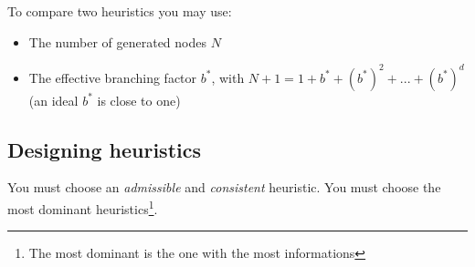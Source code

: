 To compare two heuristics you may use:
\begin{itemize}
\item The number of generated nodes $N$
\item The effective branching factor $b^*$, with $N+1 = 1 + b^* + (b^*)^2 + ... + (b^*)^d$ (an ideal $b^*$ is close to one)
\end{itemize}

\subsection{Designing heuristics}

You must choose an \textit{admissible} and \textit{consistent} heuristic. You must choose the most dominant heuristics\footnote{The most dominant is the one with the most informations}. 
